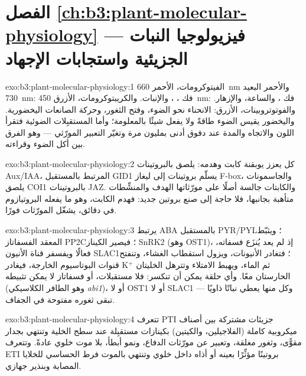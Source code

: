 \section*{الفصل \ref{ch:b3:plant-molecular-physiology} --- فيزيولوجيا النبات الجزيئية واستجابات الإجهاد}

\begin{solution}{exo:b3:plant-molecular-physiology:1}
الفيتوكرومات، الأحمر \qty{660}{nm} والأحمر البعيد \qty{730}{nm}:
فك ، ، والإنبات. والكريبتوكرومات، الأزرق
\qty{450}{nm}: فك ، والساعة، والإزهار. والفوتوتروبينات،
الأزرق: الانحناء نحو الضوء، وفتح الثغور، وحركة الصانعات
اليخضورية. واليخضور يقيس الضوء طاقةً ولا يفعل شيئًا
بالمعلومة؛ وأما المستقبِلات الضوئية فتقرأ اللون والاتجاه
والمدة عند دفوق أدنى بمليون مرة وتغيّر التعبير المورّثي ---
وهو الفرق بين أكل الضوء وقراءته.
\end{solution}

\begin{solution}{exo:b3:plant-molecular-physiology:2}
كل  يعزز يوبقنة كابت وهدمه:  يلصق 
بالبروتينات Aux/IAA،  المرتبط بالمستقبل GID1 يسلّم بروتينات
 إلى ليغاز F-box، والجاسمونات يلصق COI1 بالبروتينات JAZ.
والكابتات جالسة أصلًا على مورّثاتها الهدف والمنشِّطات
متأهبة بجانبها، فلا حاجة إلى صنع بروتين جديد: فهدم الكابت،
وهو ما يفعله البروتيازوم في دقائق، يشغّل المورّثات فورًا.
\end{solution}

\begin{solution}{exo:b3:plant-molecular-physiology:3}
يرتبط ABA بالمستقبل PYR/PYL؛ ويثبّط المعقد الفسفاتاز PP2C؛ فيصير
الكيناز SnRK2 (وهو OST1)، إذ لم يعد يُنزَع فسفاته، فعالًا
ويفسفر قناة الأنيون SLAC1؛ فتغادر الأنيونات، ويزول استقطاب
الغشاء، وتنفتح قنوات البوتاسيوم الخارجة، فيغادر K$^{+}$ ثم
الماء، ويهبط الامتلاء وتترهل الخليتان الحارستان معًا. وأي
حلقة يمكن أن تنكسر: فلا مستقبلات، أو فسفاتاز لا يمكن تثبيطه
(وهو الطافر الكلاسيكي \emph{abi1})، أو لا OST1 أو لا SLAC1 ---
وكل منها يعطي نباتًا ذاويًا تبقى ثغوره مفتوحة في الجفاف.
\end{solution}

\begin{solution}{exo:b3:plant-molecular-physiology:4}
تتعرف PTI جزيئات مشتركة بين أصناف ميكروبية كاملة
(الفلاجيلين، والكيتين) بكينازات مستقبِلة عند سطح الخلية
وتنتهي بجدار مقوًّى، وثغور مغلقة، وتعبير عن مورّثات الدفاع،
ونمو أبطأ، بلا موت خلوي عادةً. وتتعرف ETI بروتينًا مؤثِّرًا
بعينه أو أذاه  داخل خلوي وتنتهي بالموت فرط الحساسي
للخلايا المصابة وبنذير جهازي.
\end{solution}

